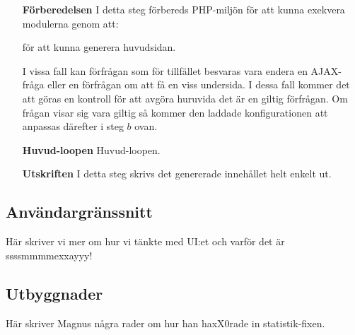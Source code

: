 \begin{itemize}
  \item[\bf Förberedelsen]
    I detta steg förbereds PHP-miljön för att kunna exekvera modulerna genom
    att:
    för att kunna generera huvudsidan.

    I vissa fall kan förfrågan som för tillfället besvaras vara endera en
    AJAX-fråga eller en förfrågan om att få en viss undersida. I dessa fall
    kommer det att göras en kontroll för att avgöra huruvida det är en giltig
    förfrågan. Om frågan visar sig vara giltig så kommer den laddade
    konfigurationen att anpassas därefter i steg $b$ ovan.

  \item[\bf Huvud-loopen]
    Huvud-loopen.

  \item[\bf Utskriften]
    I detta steg skrivs det genererade innehållet helt enkelt ut.
\end{itemize}

\subsection{Användargränssnitt}
\label{sec:ui}
Här skriver vi mer om hur vi tänkte med UI:et och varför det är ssssmmmmexxayyy!

\subsection{Utbyggnader}
\label{design:stats}
Här skriver Magnus några rader om hur han haxX0rade in statistik-fixen.
